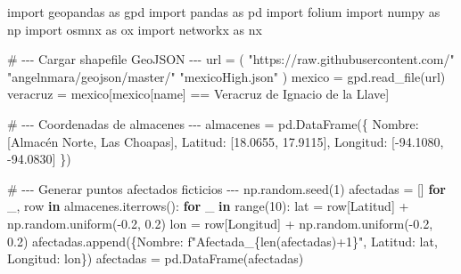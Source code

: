 \documentclass[
  spanish,
  us-letterpaper,
  DIV=11,
  numbers=noendperiod]{scrreprt}
\newenvironment{Shaded}{\begin{snugshade}}{\end{snugshade}}
\newcommand{\BuiltInTok}[1]{\textcolor[rgb]{0.00,0.23,0.31}{#1}}
\newcommand{\CommentTok}[1]{\textcolor[rgb]{0.37,0.37,0.37}{#1}}
\newcommand{\ControlFlowTok}[1]{\textcolor[rgb]{0.00,0.23,0.31}{\textbf{#1}}}
\newcommand{\DecValTok}[1]{\textcolor[rgb]{0.68,0.00,0.00}{#1}}
\newcommand{\FloatTok}[1]{\textcolor[rgb]{0.68,0.00,0.00}{#1}}
\newcommand{\ImportTok}[1]{\textcolor[rgb]{0.00,0.46,0.62}{#1}}
\newcommand{\KeywordTok}[1]{\textcolor[rgb]{0.00,0.23,0.31}{\textbf{#1}}}
\newcommand{\NormalTok}[1]{\textcolor[rgb]{0.00,0.23,0.31}{#1}}
\newcommand{\OperatorTok}[1]{\textcolor[rgb]{0.37,0.37,0.37}{#1}}
\newcommand{\SpecialCharTok}[1]{\textcolor[rgb]{0.37,0.37,0.37}{#1}}
\newcommand{\SpecialStringTok}[1]{\textcolor[rgb]{0.13,0.47,0.30}{#1}}
\newcommand{\StringTok}[1]{\textcolor[rgb]{0.13,0.47,0.30}{#1}}
\numberwithin{equation}{section}
\begin{document}
\begin{Shaded}
\begin{Highlighting}[]
\ImportTok{import}\NormalTok{ geopandas }\ImportTok{as}\NormalTok{ gpd}
\ImportTok{import}\NormalTok{ pandas }\ImportTok{as}\NormalTok{ pd}
\ImportTok{import}\NormalTok{ folium}
\ImportTok{import}\NormalTok{ numpy }\ImportTok{as}\NormalTok{ np}
\ImportTok{import}\NormalTok{ osmnx }\ImportTok{as}\NormalTok{ ox}
\ImportTok{import}\NormalTok{ networkx }\ImportTok{as}\NormalTok{ nx}

\CommentTok{\# {-}{-}{-} Cargar shapefile GeoJSON {-}{-}{-}}
\NormalTok{url }\OperatorTok{=}\NormalTok{ (}
    \StringTok{"https://raw.githubusercontent.com/"}
    \StringTok{"angelnmara/geojson/master/"}
    \StringTok{"mexicoHigh.json"}
\NormalTok{)}
\NormalTok{mexico }\OperatorTok{=}\NormalTok{ gpd.read\_file(url)}
\NormalTok{veracruz }\OperatorTok{=}\NormalTok{ mexico[mexico[}\StringTok{\textquotesingle{}name\textquotesingle{}}\NormalTok{] }\OperatorTok{==} \StringTok{\textquotesingle{}Veracruz de Ignacio de la Llave\textquotesingle{}}\NormalTok{]}

\CommentTok{\# {-}{-}{-} Coordenadas de almacenes {-}{-}{-}}
\NormalTok{almacenes }\OperatorTok{=}\NormalTok{ pd.DataFrame(\{}
    \StringTok{\textquotesingle{}Nombre\textquotesingle{}}\NormalTok{: [}\StringTok{\textquotesingle{}Almacén Norte\textquotesingle{}}\NormalTok{, }\StringTok{\textquotesingle{}Las Choapas\textquotesingle{}}\NormalTok{],}
    \StringTok{\textquotesingle{}Latitud\textquotesingle{}}\NormalTok{: [}\FloatTok{18.0655}\NormalTok{, }\FloatTok{17.9115}\NormalTok{],}
    \StringTok{\textquotesingle{}Longitud\textquotesingle{}}\NormalTok{: [}\OperatorTok{{-}}\FloatTok{94.1080}\NormalTok{, }\OperatorTok{{-}}\FloatTok{94.0830}\NormalTok{]}
\NormalTok{\})}

\CommentTok{\# {-}{-}{-} Generar puntos afectados ficticios {-}{-}{-}}
\NormalTok{np.random.seed(}\DecValTok{1}\NormalTok{)}
\NormalTok{afectadas }\OperatorTok{=}\NormalTok{ []}
\ControlFlowTok{for}\NormalTok{ \_, row }\KeywordTok{in}\NormalTok{ almacenes.iterrows():}
    \ControlFlowTok{for}\NormalTok{ \_ }\KeywordTok{in} \BuiltInTok{range}\NormalTok{(}\DecValTok{10}\NormalTok{):}
\NormalTok{        lat }\OperatorTok{=}\NormalTok{ row[}\StringTok{\textquotesingle{}Latitud\textquotesingle{}}\NormalTok{] }\OperatorTok{+}\NormalTok{ np.random.uniform(}\OperatorTok{{-}}\FloatTok{0.2}\NormalTok{, }\FloatTok{0.2}\NormalTok{)}
\NormalTok{        lon }\OperatorTok{=}\NormalTok{ row[}\StringTok{\textquotesingle{}Longitud\textquotesingle{}}\NormalTok{] }\OperatorTok{+}\NormalTok{ np.random.uniform(}\OperatorTok{{-}}\FloatTok{0.2}\NormalTok{, }\FloatTok{0.2}\NormalTok{)}
\NormalTok{        afectadas.append(\{}\StringTok{\textquotesingle{}Nombre\textquotesingle{}}\NormalTok{: }\SpecialStringTok{f"Afectada\_}\SpecialCharTok{\{}\BuiltInTok{len}\NormalTok{(afectadas)}\OperatorTok{+}\DecValTok{1}\SpecialCharTok{\}}\SpecialStringTok{"}\NormalTok{,}
         \StringTok{\textquotesingle{}Latitud\textquotesingle{}}\NormalTok{: lat, }\StringTok{\textquotesingle{}Longitud\textquotesingle{}}\NormalTok{: lon\})}
\NormalTok{afectadas }\OperatorTok{=}\NormalTok{ pd.DataFrame(afectadas)}


\end{Highlighting}
\end{Shaded}
\end{document}
